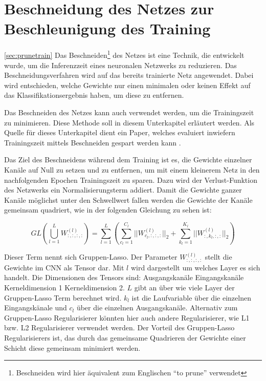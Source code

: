 \section{Beschneidung des Netzes zur Beschleunigung des Training}
\ref{sec:prunetrain}
Das Beschneiden\footnote{Beschneiden wird hier äquivalent zum Englischen  "`to prune"' verwendet} des Netzes ist eine Technik, die entwickelt wurde, um die Inferenzzeit eines neuronalen Netzwerks zu reduzieren. Das Beschneidungsverfahren wird auf das bereits trainierte Netz angewendet. Dabei wird entschieden, welche Gewichte nur einen minimalen oder keinen Effekt auf das Klassifikationsergebnis haben, um diese zu entfernen.

Das Beschneiden des Netzes kann auch verwendet werden, um die Trainingszeit zu minimieren. Diese Methode soll in diesem Unterkapitel erläutert werden. Als Quelle für dieses Unterkapitel dient ein Paper, welches evaluiert inwiefern Trainingszeit mittels Beschneiden gespart werden kann \cite{prunetrain}.


Das Ziel des Beschneidens während dem Training ist es, die Gewichte einzelner Kanäle auf Null zu setzen und zu entfernen, um mit einem kleinerem Netz in den nachfolgenden Epochen Trainingszeit zu sparen. Dazu wird der Verlust-Funktion des Netzwerks ein Normalisierungsterm addiert. Damit die Gewichte ganzer Kanäle möglichst unter den Schwellwert fallen werden die Gewichte der Kanäle gemeinsam quadriert, wie in der folgenden Gleichung zu sehen ist:

\begin{equation}
GL(\bigcup_{l=1}^{L} W_{:,:,:,:}^{(l)})=\sum_{l=1}^{L} \left( \sum_{c_l=1}^{C_l} || W_{c_l,:,:,:}^{(l)} ||_2 + \sum_{k_l=1}^{K_l} || W_{:,k_l,:,:}^{(l)}||_2 \right)
 \label{equ:PTloss}
\end{equation}

Dieser Term nennt sich Gruppen-Lasso. Der Parameter $W_{:,:,:,:}^{(l)}$ stellt die Gewichte im CNN als Tensor dar. Mit $l$ wird dargestellt um welches Layer es sich handelt. Die Dimensionen des Tensors sind: Ausgangskanäle \texttimes Eingangskanäle \texttimes Kerneldimension 1 \texttimes Kerneldimension 2. $L$ gibt an über wie viele Layer der Gruppen-Lasso Term berechnet wird. $k_l$ ist die Laufvariable über die einzelnen Eingangskänale und $c_l$ über die einzelnen Ausgangskanäle. Alternativ zum Gruppen-Lasso Regularisierer könnten hier auch andere Regularisierer, wie L1 bzw. L2 Regularisierer verwendet werden. Der Vorteil des Gruppen-Lasso Regularisierers ist, das durch das gemeinsame Quadrieren der Gewichte einer Schicht diese gemeinsam minimiert werden.


